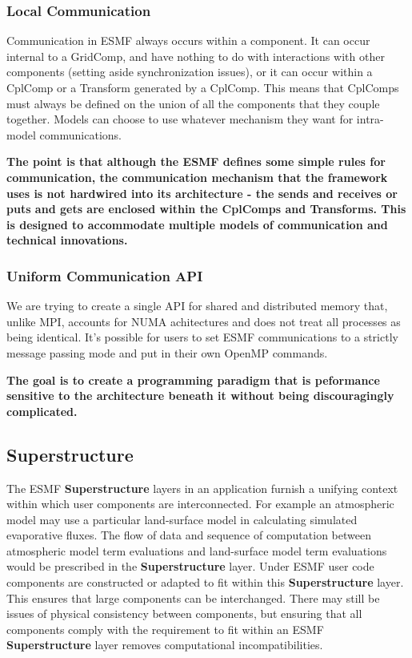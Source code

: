 \subsubsection{Local Communication}
Communication in ESMF always occurs within a component.  It
can occur internal to a GridComp, and have nothing to do 
with interactions with other components (setting aside 
synchronization issues), or it can occur within a CplComp
or a Transform generated by a CplComp.  This means that
CplComps must always be defined on the union of all the
components that they couple together.  Models can choose to 
use whatever mechanism they want for intra-model communications.  

{\bf The point is that although the ESMF defines some simple rules 
for communication, the communication mechanism that the 
framework uses is not hardwired into its architecture -
the sends and receives or puts and gets are enclosed within 
the CplComps and Transforms. This is designed to accommodate 
multiple models of communication and technical innovations.}

\subsubsection{Uniform Communication API}
We are trying to create a single API for shared and distributed
memory that, unlike MPI, accounts for NUMA achitectures and 
does not treat all processes as being identical.  It's possible for
users to set ESMF communications to a strictly message passing 
mode and put in their own OpenMP commands.

{\bf The goal is to create a programming paradigm 
that is peformance sensitive to the architecture beneath it 
without being discouragingly complicated.}

\subsection{Superstructure}
\label{sec:superstructure}
The ESMF {\bf Superstructure} layers in an application furnish a unifying context within which user components are interconnected. For 
example an atmospheric model may use a particular land-surface model in calculating simulated evaporative fluxes. 
The flow of data and sequence of computation between atmospheric model term evaluations and land-surface model
term evaluations would be prescribed in the {\bf Superstructure} layer. Under ESMF user code components are constructed or adapted
to fit within this {\bf Superstructure} layer. This ensures that large components can be interchanged. There may still be issues
of physical consistency between components, but ensuring that all components comply with the requirement to fit
within an ESMF {\bf Superstructure} layer removes computational incompatibilities. 

